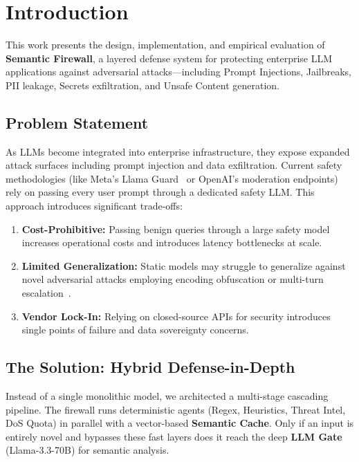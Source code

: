 \documentclass[conference]{IEEEtran}
\begin{document}
\section{Introduction}

This work presents the design, implementation, and empirical evaluation of \textbf{Semantic Firewall}, a layered defense system for protecting enterprise LLM applications against adversarial attacks---including Prompt Injections, Jailbreaks, PII leakage, Secrets exfiltration, and Unsafe Content generation.

\subsection{Problem Statement}

As LLMs become integrated into enterprise infrastructure, they expose expanded attack surfaces including prompt injection and data exfiltration. Current safety methodologies (like Meta's Llama Guard~\cite{llamaguard} or OpenAI's moderation endpoints) rely on passing every user prompt through a dedicated safety LLM. This approach introduces significant trade-offs:

\begin{enumerate}
    \item \textbf{Cost-Prohibitive:} Passing benign queries through a large safety model increases operational costs and introduces latency bottlenecks at scale.
    \item \textbf{Limited Generalization:} Static models may struggle to generalize against novel adversarial attacks employing encoding obfuscation or multi-turn escalation~\cite{wei_jailbroken}.
    \item \textbf{Vendor Lock-In:} Relying on closed-source APIs for security introduces single points of failure and data sovereignty concerns.
\end{enumerate}

\subsection{The Solution: Hybrid Defense-in-Depth}

Instead of a single monolithic model, we architected a multi-stage cascading pipeline. The firewall runs deterministic agents (Regex, Heuristics, Threat Intel, DoS Quota) in parallel with a vector-based \textbf{Semantic Cache}. Only if an input is entirely novel and bypasses these fast layers does it reach the deep \textbf{LLM Gate} (Llama-3.3-70B) for semantic analysis.
\end{document}

